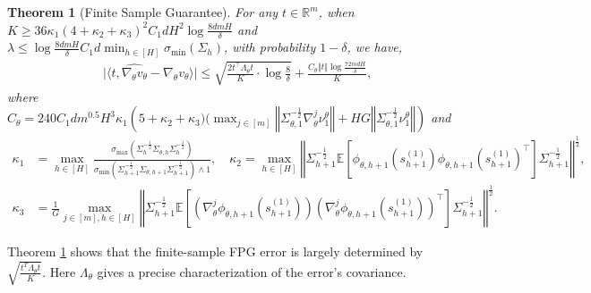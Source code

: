 \documentclass{article}
\newtheorem{theorem}{Theorem}[section]
\numberwithin{equation}{section}
\begin{document}
\begin{theorem}[Finite Sample Guarantee] 
\label{thm2_var}
For any $t\in\mathbb{R}^m$, when $K\geq 36\kappa_1(4+\kappa_2+\kappa_3)^2C_1dH^2\log\frac{8dmH}{\delta}$ and $\lambda\leq\log\frac{8dmH}{\delta}C_1d\min_{h\in[H]}\sigma_{\min}(\Sigma_h)$, with probability $1-\delta$, we have,
\begin{align*}
    &\vert\langle t, \widehat{\nabla_\theta v_\theta}-\nabla_\theta v_\theta\rangle \vert\leq  \sqrt{\frac{2t^\top\Lambda_\theta t}{K}\cdot \log\frac{8}{\delta}}+\frac{C_\theta\Vert t\Vert\log\frac{72mdH}{\delta}}{K},
\end{align*}
where $C_\theta=240C_1dm^{0.5}H^3\kappa_1\left(5+\kappa_2+\kappa_3)(\max_{j\in[m]}\left\Vert\Sigma_{\theta,1}^{-\frac{1}{2}}\nabla_\theta^j\nu^\theta_1\right\Vert+HG\left\Vert\Sigma_{\theta,1}^{-\frac{1}{2}}\nu^\theta_1\right\Vert\right)$ and
\begin{align*}
    \kappa_1&=\max_{h\in[H]}\frac{\sigma_{\max}\left(\Sigma_h^{-\frac{1}{2}}\Sigma_{\theta,h}\Sigma_h^{-\frac{1}{2}}\right)}{\sigma_{\min}\left(\Sigma_{h+1}^{-\frac{1}{2}}\Sigma_{\theta,h+1}\Sigma_{h+1}^{-\frac{1}{2}}\right)\wedge 1},\quad\kappa_2=\max_{h\in[H]}\left\Vert\Sigma_{h+1}^{-\frac{1}{2}}\mathbb{E}\left[\phi_{\theta,h+1}\left(s_{h+1}^{(1)}\right)\phi_{\theta,h+1}\left(s_{h+1}^{(1)}\right)^\top\right]\Sigma_{h+1}^{-\frac{1}{2}}\right\Vert^{\frac{1}{2}},\\
    \kappa_3&=\frac{1}{G}\max_{j\in[m],h\in[H]}\left\Vert\Sigma_{h+1}^{-\frac{1}{2}}\mathbb{E}\left[\left(\nabla_\theta^j \phi_{\theta,h+1}\left(s_{h+1}^{(1)}\right)\right)\left(\nabla_\theta^j \phi_{\theta,h+1}\left(s_{h+1}^{(1)}\right)\right)^\top\right]\Sigma_{h+1}^{-\frac{1}{2}}\right\Vert^{\frac{1}{2}}.
\end{align*}
\end{theorem}
Theorem \ref{thm2_var} shows that the finite-sample FPG error is largely determined by $\sqrt{\frac{t^T \Lambda_{\theta}t}{K}}.$ Here $\Lambda_{\theta}$ gives a precise characterization of the error's covariance. 
\end{document}
